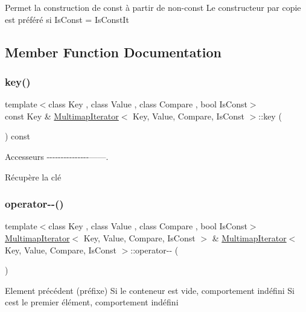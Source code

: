 Permet la construction de const à partir de non-\/const Le constructeur par copie est préféré si Is\+Const = Is\+Const\+It 

\subsection{Member Function Documentation}
\mbox{\label{classMultimapIterator_a016fca3267d16d48b57964ee39d9efae}} 
\subsubsection{\texorpdfstring{key()}{key()}}
{\footnotesize\ttfamily template$<$class Key , class Value , class Compare , bool Is\+Const$>$ \\
const Key \& \hyperlink{classMultimapIterator}{Multimap\+Iterator}$<$ Key, Value, Compare, Is\+Const $>$\+::key (\begin{DoxyParamCaption}{ }\end{DoxyParamCaption}) const}



Accesseurs -\/-\/-\/-\/-\/-\/-\/-\/-\/-\/-\/-\/-\/-\/-\/------. 

Récupère la clé \mbox{\label{classMultimapIterator_a70a34f78b77e58c3137066f3515628fd}} 
\subsubsection{\texorpdfstring{operator-\/-\/()}{operator--()}\hspace{0.1cm}{\footnotesize\ttfamily [1/2]}}
{\footnotesize\ttfamily template$<$class Key , class Value , class Compare , bool Is\+Const$>$ \\
\hyperlink{classMultimapIterator}{Multimap\+Iterator}$<$ Key, Value, Compare, Is\+Const $>$ \& \hyperlink{classMultimapIterator}{Multimap\+Iterator}$<$ Key, Value, Compare, Is\+Const $>$\+::operator-\/-\/ (\begin{DoxyParamCaption}{ }\end{DoxyParamCaption})}

Element précédent (préfixe) Si le conteneur est vide, comportement indéfini Si c\textquotesingle{}est le premier élément, comportement indéfini \mbox{\label{classMultimapIterator_acda65b98718a6dea2194f69dbdbcf5ee}} 
